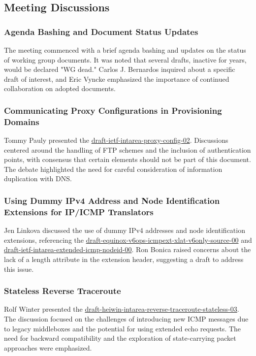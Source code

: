 \documentclass{article}
\begin{document}
\subsection{Meeting Discussions}

\subsubsection{Agenda Bashing and Document Status Updates}
The meeting commenced with a brief agenda bashing and updates on the status of working group documents. It was noted that several drafts, inactive for years, would be declared "WG dead." Carlos J. Bernardos inquired about a specific draft of interest, and Eric Vyncke emphasized the importance of continued collaboration on adopted documents.

\subsubsection{Communicating Proxy Configurations in Provisioning Domains}
Tommy Pauly presented the \href{https://datatracker.ietf.org/doc/html/draft-ietf-intarea-proxy-config-02}{draft-ietf-intarea-proxy-config-02}. Discussions centered around the handling of FTP schemes and the inclusion of authentication points, with consensus that certain elements should not be part of this document. The debate highlighted the need for careful consideration of information duplication with DNS.

\subsubsection{Using Dummy IPv4 Address and Node Identification Extensions for IP/ICMP Translators}
Jen Linkova discussed the use of dummy IPv4 addresses and node identification extensions, referencing the \href{https://datatracker.ietf.org/doc/html/draft-equinox-v6ops-icmpext-xlat-v6only-source-00}{draft-equinox-v6ops-icmpext-xlat-v6only-source-00} and \href{https://datatracker.ietf.org/doc/html/draft-ietf-intarea-extended-icmp-nodeid-00}{draft-ietf-intarea-extended-icmp-nodeid-00}. Ron Bonica raised concerns about the lack of a length attribute in the extension header, suggesting a draft to address this issue.

\subsubsection{Stateless Reverse Traceroute}
Rolf Winter presented the \href{https://datatracker.ietf.org/doc/html/draft-heiwin-intarea-reverse-traceroute-stateless-03}{draft-heiwin-intarea-reverse-traceroute-stateless-03}. The discussion focused on the challenges of introducing new ICMP messages due to legacy middleboxes and the potential for using extended echo requests. The need for backward compatibility and the exploration of state-carrying packet approaches were emphasized.
\end{document}
